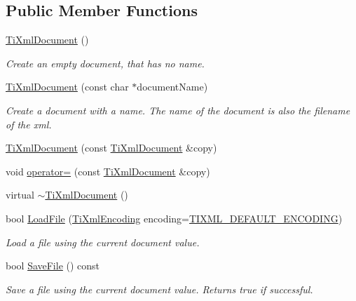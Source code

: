 \subsection*{Public Member Functions}
\begin{DoxyCompactItemize}
\item 
\hyperlink{classTiXmlDocument_a9f5e84335708fde98400230f9f12659c}{TiXmlDocument} ()
\begin{DoxyCompactList}\small\item\em Create an empty document, that has no name. \item\end{DoxyCompactList}\item 
\hyperlink{classTiXmlDocument_ae4508b452d0c3061db085f3db27b8396}{TiXmlDocument} (const char $\ast$documentName)
\begin{DoxyCompactList}\small\item\em Create a document with a name. The name of the document is also the filename of the xml. \item\end{DoxyCompactList}\item 
\hyperlink{classTiXmlDocument_a323a7486e7da6099cdc19a5ff7e74b07}{TiXmlDocument} (const \hyperlink{classTiXmlDocument}{TiXmlDocument} \&copy)
\item 
void \hyperlink{classTiXmlDocument_aafbfacc3414008f619b1345775ef12a4}{operator=} (const \hyperlink{classTiXmlDocument}{TiXmlDocument} \&copy)
\item 
virtual \hyperlink{classTiXmlDocument_a1b8a035c2c2aab38e4387246a0b712c5}{$\sim$TiXmlDocument} ()
\item 
bool \hyperlink{classTiXmlDocument_a4c852a889c02cf251117fd1d9fe1845f}{LoadFile} (\hyperlink{tinyxml_8h_a88d51847a13ee0f4b4d320d03d2c4d96}{TiXmlEncoding} encoding=\hyperlink{tinyxml_8h_ad5b8b092878e9010d6400cb6c13d4879}{TIXML\_\-DEFAULT\_\-ENCODING})
\begin{DoxyCompactList}\small\item\em Load a file using the current document value. \item\end{DoxyCompactList}\item 
bool \hyperlink{classTiXmlDocument_a21c0aeb0d0a720169ad4ac89523ebe93}{SaveFile} () const 
\begin{DoxyCompactList}\small\item\em Save a file using the current document value. Returns true if successful. \item\end{DoxyCompactList}\item 

\end{DoxyCompactItemize}
